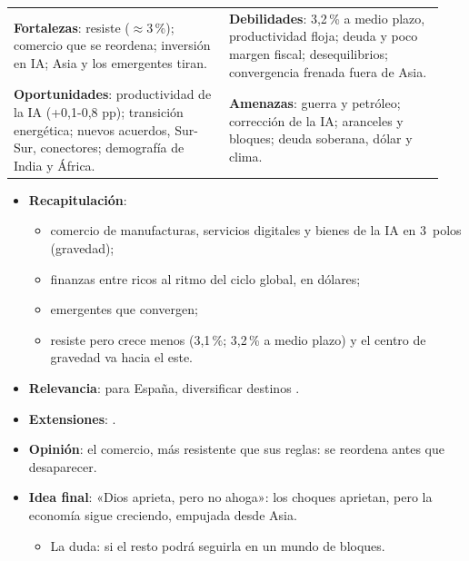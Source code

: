 \documentclass{article}
\begin{document}
\begin{columnas}
\begin{center}\footnotesize
\begin{tabular}{@{}p{0.47\linewidth}p{0.47\linewidth}@{}}
\cellcolor{tceesalvia}\textcolor{tceeverde}{\textbf{Fortalezas}}: resiste ($\approx$3\,\%); comercio que se reordena; inversión en IA; Asia y los emergentes tiran. &
\cellcolor{tceesalmon}\textcolor{tceerojo}{\textbf{Debilidades}}: 3,2\,\% a medio plazo, productividad floja; deuda y poco margen fiscal; desequilibrios; convergencia frenada fuera de Asia.\\
\cellcolor{tceeazulpalido}\textcolor{tceeazul}{\textbf{Oportunidades}}: productividad de la IA (+0,1-0,8 pp); transición energética; nuevos acuerdos, Sur-Sur, conectores; demografía de India y África. &
\cellcolor{tceegrisclaro}\textcolor{tceedorado}{\textbf{Amenazas}}: guerra y petróleo; corrección de la IA; aranceles y bloques; deuda soberana, dólar y clima.\\
\end{tabular}
\end{center}

\begin{itemize}
\item \textbf{Recapitulación}:
  \begin{itemize}
  \item comercio de manufacturas, servicios digitales y bienes de la IA en 3~polos (gravedad);
  \item finanzas entre ricos al ritmo del ciclo global, en dólares;
  \item emergentes que convergen;
  \item resiste pero crece menos (3,1\,\%; 3,2\,\% a medio plazo) y el centro de gravedad va hacia el este.
  \end{itemize}
\item \textbf{Relevancia}: para España, diversificar destinos  .
\item \textbf{Extensiones}:      .
\item \textbf{Opinión}: el comercio, más resistente que sus reglas: se reordena antes que desaparecer.
\item \textbf{Idea final}: «Dios aprieta, pero no ahoga»: los choques aprietan, pero la economía sigue creciendo, empujada desde Asia.
  \begin{itemize}
  \item La duda: si el resto podrá seguirla en un mundo de bloques.
  \end{itemize}
\end{itemize}


\end{columnas}
\end{document}
